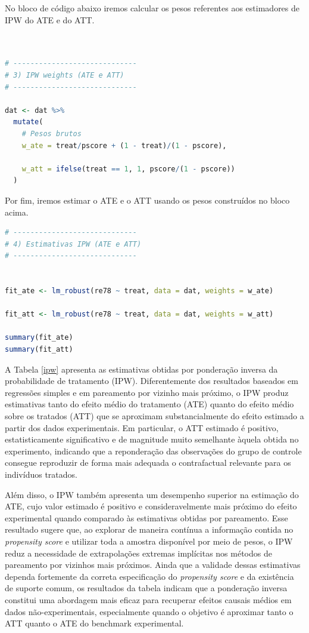 No bloco de código abaixo iremos calcular os pesos referentes aos estimadores de IPW do ATE e do ATT.

\begin{boxH}
\begin{lstlisting}[language = R]


# -----------------------------
# 3) IPW weights (ATE e ATT)
# -----------------------------

dat <- dat %>%
  mutate(
    # Pesos brutos
    w_ate = treat/pscore + (1 - treat)/(1 - pscore),
    
    w_att = ifelse(treat == 1, 1, pscore/(1 - pscore))
  ) 

\end{lstlisting}
\end{boxH}

Por fim, iremos estimar o ATE e o ATT usando os pesos construídos no bloco acima.

\begin{boxH}
\begin{lstlisting}[language = R]
# -----------------------------
# 4) Estimativas IPW (ATE e ATT)
# -----------------------------


fit_ate <- lm_robust(re78 ~ treat, data = dat, weights = w_ate)

fit_att <- lm_robust(re78 ~ treat, data = dat, weights = w_att)

summary(fit_ate)
summary(fit_att)

\end{lstlisting}
\end{boxH}

A Tabela \ref{ipw} apresenta as estimativas obtidas por ponderação inversa da probabilidade de tratamento (IPW). Diferentemente dos resultados baseados em regressões simples e em pareamento por vizinho mais próximo, o IPW produz estimativas tanto do efeito médio do tratamento (ATE) quanto do efeito médio sobre os tratados (ATT) que se aproximam substancialmente do efeito estimado a partir dos dados experimentais. Em particular, o ATT estimado é positivo, estatisticamente significativo e de magnitude muito semelhante àquela obtida no experimento, indicando que a reponderação das observações do grupo de controle consegue reproduzir de forma mais adequada o contrafactual relevante para os indivíduos tratados.

Além disso, o IPW também apresenta um desempenho superior na estimação do ATE, cujo valor estimado é positivo e consideravelmente mais próximo do efeito experimental quando comparado às estimativas obtidas por pareamento. Esse resultado sugere que, ao explorar de maneira contínua a informação contida no \textit{propensity score} e utilizar toda a amostra disponível por meio de pesos, o IPW reduz a necessidade de extrapolações extremas implícitas nos métodos de pareamento por vizinhos mais próximos. Ainda que a validade dessas estimativas dependa fortemente da correta especificação do \textit{propensity score} e da existência de suporte comum, os resultados da tabela indicam que a ponderação inversa constitui uma abordagem mais eficaz para recuperar efeitos causais médios em dados não-experimentais, especialmente quando o objetivo é aproximar tanto o ATT quanto o ATE do benchmark experimental.



